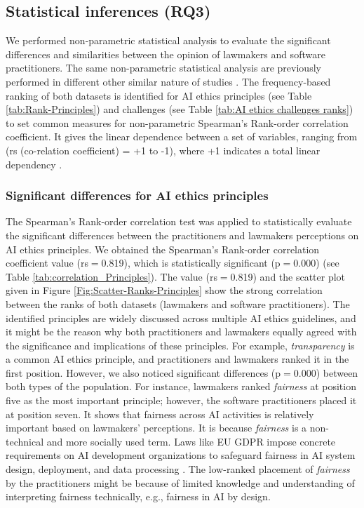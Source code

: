 \subsection{Statistical inferences (RQ3)} \label{sec:Statistical inferences (RQ3)}

We performed non-parametric statistical analysis \cite{myers2004spearman}\cite{de2016comparing} to evaluate the significant differences  and similarities between the opinion of lawmakers and software practitioners. The same non-parametric statistical analysis are previously performed in different other similar nature of studies  \cite{akbar2022srcmimm}\cite{khan2020systematic}\cite{khan2017systematic}. The frequency-based ranking of both datasets is identified for AI ethics principles (see Table \ref{tab:Rank-Principles}) and challenges (see Table  \ref{tab:AI ethics challenges ranks}) to set common measures for non-parametric Spearman's Rank-order correlation coefficient. It gives the linear  dependence between a set of variables, ranging from (rs (co-relation coefficient) = +1 to -1), where +1 indicates a total linear dependency \cite{myers2004spearman}\cite{de2016comparing}.

\subsubsection{Significant differences for AI ethics principles}

The Spearman's Rank-order correlation test was applied to statistically evaluate the significant differences between the practitioners and lawmakers perceptions on AI ethics principles. We obtained the Spearman's Rank-order correlation coefficient value (rs$=$0.819), which is statistically significant (p$=$0.000) (see Table \ref{tab:correlation_Principles}). The value (rs$=$0.819) and the scatter plot given in Figure \ref{Fig:Scatter-Ranks-Principles} show the strong correlation between the ranks of both datasets (lawmakers and software practitioners). The identified principles are widely discussed across multiple AI ethics guidelines, and it might be the reason why both practitioners and lawmakers equally agreed with the significance and implications of these principles. For example, \textit{transparency} is a common AI ethics principle, and practitioners and lawmakers ranked it in the first position. However, we also noticed significant differences (p$=$0.000) between both types of the population. For instance, lawmakers ranked \textit{fairness} at position five as the most important principle; however, the software practitioners placed it at position seven. It shows that fairness across AI activities is relatively important based on lawmakers' perceptions. It is because \textit{fairness} is a non-technical and more socially used term. Laws like EU GDPR impose concrete requirements on AI development organizations to safeguard fairness in AI system design, deployment, and data processing \cite{GDPR}. The low-ranked placement of \textit{fairness} by the practitioners might be because of limited knowledge and understanding of interpreting fairness technically, e.g., fairness in AI by design.

